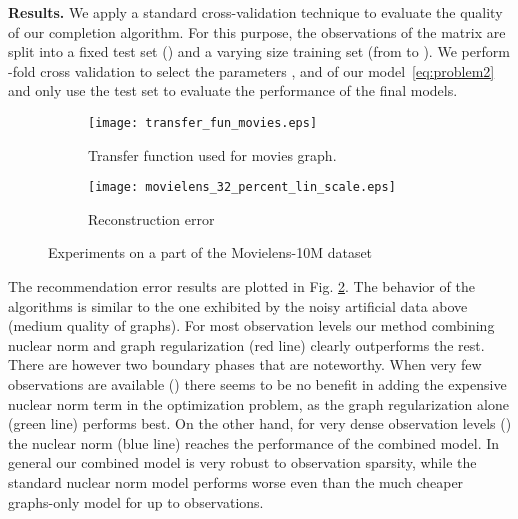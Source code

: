 \documentclass{article}
\begin{document}
{\bf Results. }
We apply a standard cross-validation technique to evaluate the quality of our completion algorithm. For this purpose, the  observations of the  matrix are split into a fixed test set () and a varying size training set (from  to ). We perform -fold cross validation to select the parameters ,  and  of our model~\eqref{eq:problem2} and only use the test set to evaluate the performance of the final models.
\begin{figure}
        \begin{subfigure}[b]{.5\linewidth}
            \centering \texttt{[image: transfer\_fun\_movies.eps]}
            \caption{Transfer function used for movies graph.}\label{fig:transfer_fun_movies}
          \end{subfigure}
          \begin{subfigure}[b]{.5\linewidth}
\centering\texttt{[image: movielens\_32\_percent\_lin\_scale.eps]}
            \caption{Reconstruction error}\label{fig:real_final}
          \end{subfigure}
         \caption{Experiments on a part of the Movielens-10M dataset}\label{fig:data_real}
	\vspace{-0.25cm}
\end{figure}
The recommendation error results are plotted in Fig. \ref{fig:real_final}. 
The behavior of the algorithms is similar to the one exhibited by the noisy artificial data above (medium quality of graphs). For most observation levels our method combining nuclear norm and graph regularization (red line) clearly outperforms the rest. There are however two boundary phases that are noteworthy. When very few observations are available () there seems to be no benefit in adding the expensive nuclear norm term in the optimization problem, as the graph regularization alone (green line) performs best. On the other hand, for very dense observation levels () the nuclear norm (blue line) reaches the performance of the combined model. In general our combined model is very robust to observation sparsity, while the standard nuclear norm model performs worse even than the much cheaper graphs-only model for up to  observations.
\end{document}
